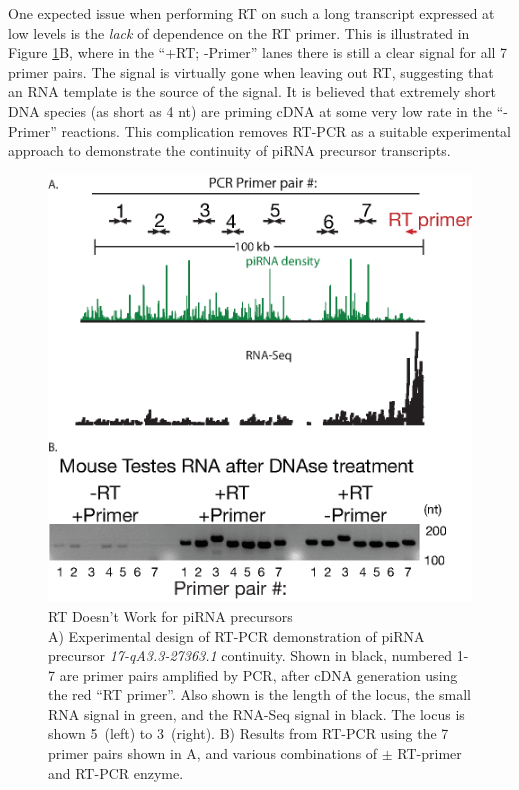     One expected issue when performing RT on such a long transcript expressed at low levels is the \textit{lack} of dependence on the RT primer. This is illustrated in Figure \ref{SeqZipMethod:fig:RT doesn't work for precursors}B, where in the ``+RT; -Primer'' lanes there is still a clear signal for all 7 primer pairs. The signal is virtually gone when leaving out RT, suggesting that an RNA template is the source of the signal. It is believed that extremely short DNA species (as short as 4 nt) are priming cDNA at some very low rate in the ``-Primer'' reactions. This complication removes RT-PCR as a suitable experimental approach to demonstrate the continuity of piRNA precursor transcripts.

    \begin{figure} %
      \centering 
      \includegraphics{Figures/SeqZipMethod/RTDoesntWork.eps}
      \caption[pRT Doesn't Work for piRNA precursors]
      {
        RT Doesn't Work for piRNA precursors\\[0.25cm]
        A) Experimental design of RT-PCR demonstration of piRNA precursor \textit{17-qA3.3-27363.1} continuity. Shown in black, numbered 1-7 are primer pairs amplified by PCR, after cDNA generation using the red ``RT primer''. Also shown is the length of the locus, the small RNA signal in green, and the RNA-Seq signal in black. The locus is shown 5\textprime~(left) to 3\textprime~(right). B) Results from RT-PCR using the 7 primer pairs shown in A, and various combinations of $\pm$ RT-primer and RT-PCR enzyme.
      	}
      \label{SeqZipMethod:fig:RT doesn't work for precursors}
    	\end{figure}

